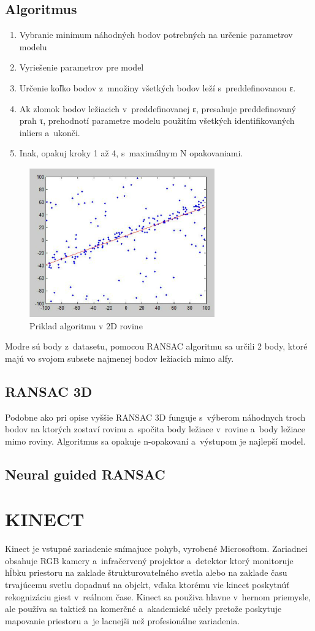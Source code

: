 \subsection{Algoritmus}
\begin{enumerate}
    \item Vybranie minimum náhodných bodov potrebných na určenie parametrov modelu
    \item Vyriešenie parametrov pre model
    \item Určenie koľko bodov z množiny všetkých bodov leží s preddefinovanou ε.
    \item Ak zlomok bodov ležiacich v preddefinovanej ε, presahuje preddefinovaný prah τ, prehodnotí parametre modelu použitím všetkých identifikovaných inliers a ukonči.
    \item Inak, opakuj kroky 1 až 4, s maximálnym N opakovaniami.
\end{enumerate}
\begin{figure}[!htbp]
  \centering
  \includegraphics[width=8cm]{img/ransac2D.png}
  \caption{Priklad algoritmu v 2D rovine}
  \label{vzhladobr}
\end{figure}
Modre sú body z datasetu, pomocou RANSAC algoritmu sa určili 2 body, ktoré majú vo svojom subsete najmenej bodov ležiacich mimo alfy.
\subsection{RANSAC 3D}
Podobne ako pri opise vyššie RANSAC 3D funguje s výberom náhodnych troch bodov na ktorých zostaví rovinu a spočita body ležiace v rovine a body ležiace mimo roviny. Algoritmus sa opakuje n-opakovaní a výstupom je najlepší model.
\subsection{Neural guided RANSAC}
\section{KINECT}
Kinect je vstupné zariadenie snímajuce pohyb, vyrobené Microsoftom. Zariadnei obsahuje RGB kamery a infračervený projektor a detektor ktorý monitoruje hĺbku priestoru na zaklade štrukturovateľného svetla alebo na zaklade času trvajúcemu svetlu dopadnuť na objekt, vďaka ktorému vie kinect poskytnúť rekognizáciu giest v reálnom čase. Kinect sa použiva hlavne v hernom priemysle, ale používa sa taktiež na komerčné a akademické učely pretože poskytuje mapovanie priestoru a je lacnejši než profesionálne zariadenia.  
